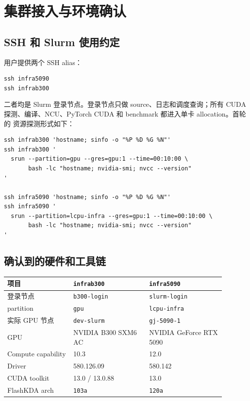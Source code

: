 \documentclass[11pt,a4paper,fontset=none]{ctexart}
\newcommand{\code}[1]{\texttt{#1}}
\begin{document}
\section{集群接入与环境确认}

\subsection{SSH 和 Slurm 使用约定}

用户提供两个 SSH alias：

\begin{lstlisting}
ssh infra5090
ssh infrab300
\end{lstlisting}

二者均是 Slurm 登录节点。登录节点只做 source、日志和调度查询；所有 CUDA
探测、编译、NCU、PyTorch CUDA 和 benchmark 都进入单卡 allocation。首轮的
资源探测形式如下：

\begin{lstlisting}
ssh infrab300 'hostname; sinfo -o "%P %D %G %N"'
ssh infrab300 '
  srun --partition=gpu --gres=gpu:1 --time=00:10:00 \
       bash -lc "hostname; nvidia-smi; nvcc --version"
'

ssh infra5090 'hostname; sinfo -o "%P %D %G %N"'
ssh infra5090 '
  srun --partition=lcpu-infra --gres=gpu:1 --time=00:10:00 \
       bash -lc "hostname; nvidia-smi; nvcc --version"
'
\end{lstlisting}

\subsection{确认到的硬件和工具链}

\begin{longtable}{@{}L{0.27\linewidth}L{0.31\linewidth}L{0.31\linewidth}@{}}
\toprule
项目 & \code{infrab300} & \code{infra5090} \\
\midrule
\endhead
\bottomrule
\endlastfoot
登录节点 & \code{b300-login} & \code{slurm-login} \\
partition & \code{gpu} & \code{lcpu-infra} \\
实际 GPU 节点 & \code{dev-slurm} & \code{gj-5090-1} \\
GPU & NVIDIA B300 SXM6 AC & NVIDIA GeForce RTX 5090 \\
Compute capability & 10.3 & 12.0 \\
Driver & 580.126.09 & 580.142 \\
CUDA toolkit & 13.0 / 13.0.88 & 13.0 \\
FlashKDA arch & \code{103a} & \code{120a} \\
\end{longtable}
\end{document}
